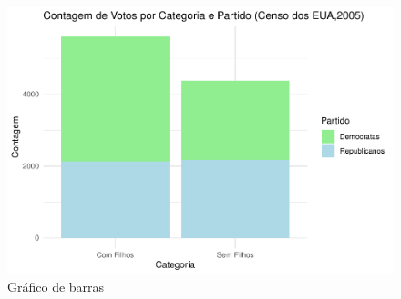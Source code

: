 \documentclass[
]{book}
\begin{document}
\begin{figure}
\centering
\includegraphics{apostila_files/figure-latex/unnamed-chunk-58-1.pdf}
\caption{\label{fig:unnamed-chunk-58}Gráfico de barras}
\end{figure}

\hfill\break
\end{document}
